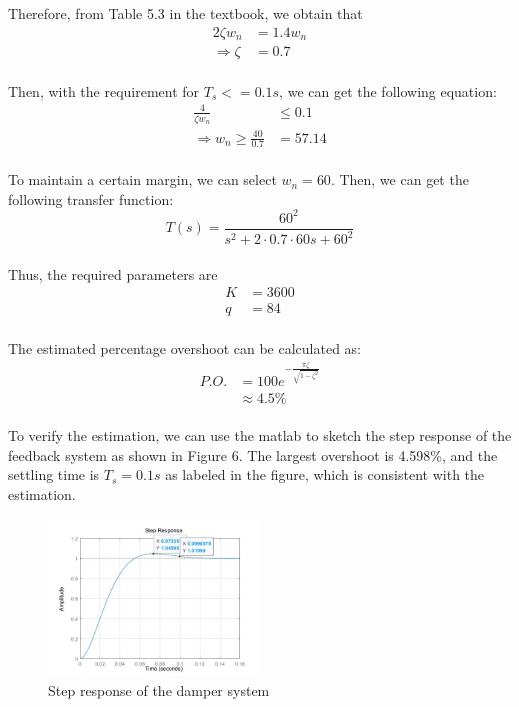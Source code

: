 \documentclass{article}
\begin{document}
Therefore, from Table 5.3 in the textbook, we obtain that
\begin{align*}
    2\zeta w_n&=1.4w_n\\
    \Rightarrow \zeta&=0.7
\end{align*}\\

Then, with the requirement for $T_s<=0.1s$, we can get the following equation:
\begin{align*}
    \frac{4}{\zeta w_n} &\leq 0.1\\
    \Rightarrow w_n\geq \frac{40}{0.7}&=57.14
\end{align*}\\

To maintain a certain margin, we can select $w_n=60$.
Then, we can get the following transfer function:
\begin{equation*}
    T(s)=\frac{60^2}{s^2+2\cdot 0.7\cdot 60s+60^2}
\end{equation*}\\

Thus, the required parameters are
\begin{align*}
    K&=3600\\
    q&=84
\end{align*}\\

The estimated percentage overshoot can be calculated as:
\begin{align*}
    P.O.&=100e^{-\frac{\pi \zeta}{\sqrt{1-\zeta ^2}}}\\
    &\approx 4.5\%
\end{align*}\\

To verify the estimation, we can use the matlab to sketch the step response of the feedback system as shown in Figure 6.
The largest overshoot is 4.598\%, and the settling time is $T_s = 0.1s$ as labeled in the figure, which is consistent with the estimation.\\

\begin{figure}[htbp]
    \centering
    \includegraphics[width=0.5\textwidth]{8.jpg}
    \caption{Step response of the damper system}
\end{figure}
\end{document}
